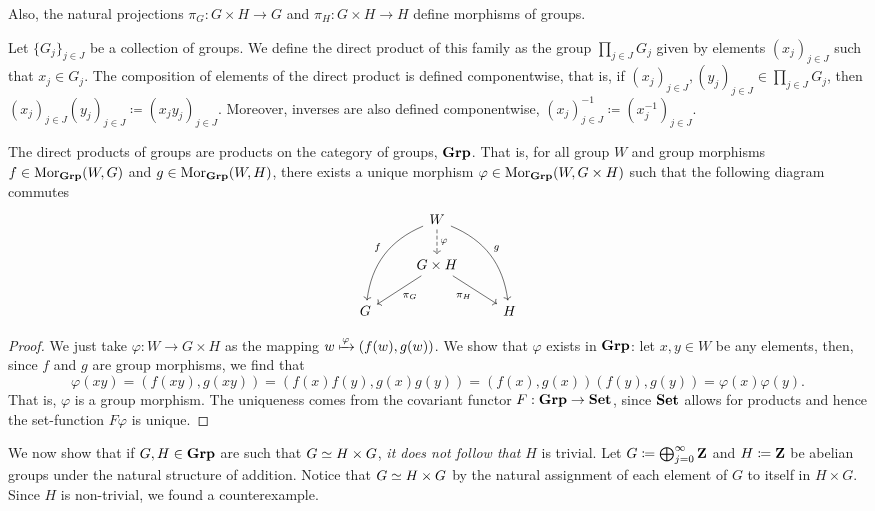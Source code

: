 Also, the natural projections \(\pi_G: G \times H \to G\) and \(\pi_H: G \times
H \to H\) define morphisms of groups.

\begin{definition}
Let \(\{G_{j}\}_{j \in J}\) be a collection of groups. We define the direct
product of this family as the group \(\prod_{j \in J} G_j\) given by elements
\((x_j)_{j \in J}\) such that \(x_j \in G_j\). The composition of elements of
the direct product is defined componentwise, that is, if \((x_j)_{j \in J},
(y_j)_{j \in J} \in \prod_{j \in J} G_j\), then \((x_j)_{j \in J} (y_j)_{j \in
J} \coloneq (x_j y_j)_{j \in J}\). Moreover, inverses are also defined
componentwise, \((x_j)_{j \in J}^{-1} \coloneq (x_j^{-1})_{j \in J}\).
\end{definition}

\begin{proposition}
The direct products of groups are products on the category of groups,
\({\textbf{Grp}}\). That is, for all group \(W\) and group morphisms \(f \in
\operatorname{Mor}_{\textbf{Grp}}(W, G)\) and \(g \in \operatorname{Mor}_{\textbf{Grp}}(W, H)\), there exists a unique
morphism \(\varphi \in \operatorname{Mor}_{\textbf{Grp}}(W, G \times H)\) such that the following
diagram commutes
\[
  \begin{tikzcd}
    &W
    \ar[d, dashed, "\varphi"]
    \ar[ddr, bend left, "g"]
    \ar[ddl, swap, bend right, "f"]
    & \\
    &G \times H \ar[dr, swap, "\pi_H"] \ar[dl, "\pi_G"] & \\
    G & &H
  \end{tikzcd}
\]
\end{proposition}

\begin{proof}
We just take \(\varphi: W \to G \times H\) as the mapping \(w \xmapsto \varphi
(f(w), g(w))\). We show that \(\varphi\) exists in \({\textbf{Grp}}\): let \(x, y \in
W\) be any elements, then, since \(f\) and \(g\) are group morphisms, we find
that
\[
  \varphi(xy) = (f(xy), g(xy)) = (f(x) f(y), g(x) g(y))
  = (f(x), g(x)) (f(y), g(y)) = \varphi(x) \varphi(y).
\]
That is, \(\varphi\) is a group morphism. The uniqueness comes from the
covariant functor \(F: {\textbf{Grp}} \to {\textbf{Set}}\), since \({\textbf{Set}}\) allows for products and
hence the set-function \(F \varphi\) is unique.
\end{proof}

\begin{remark}
We now show that if \(G, H \in {\textbf{Grp}}\) are such that \(G \simeq H \times G\),
\emph{it does not follow that} \(H\) is trivial.
Let \(G \coloneq \bigoplus_{j=0}^{\infty} \mathbf{Z}\) and \(H \coloneq \mathbf{Z}\) be abelian
groups under the natural structure of addition. Notice that \(G \simeq H \times
G\) by the natural assignment of each element of \(G\) to itself in \(H \times
G\). Since \(H\) is non-trivial, we found a counterexample.
\end{remark}

